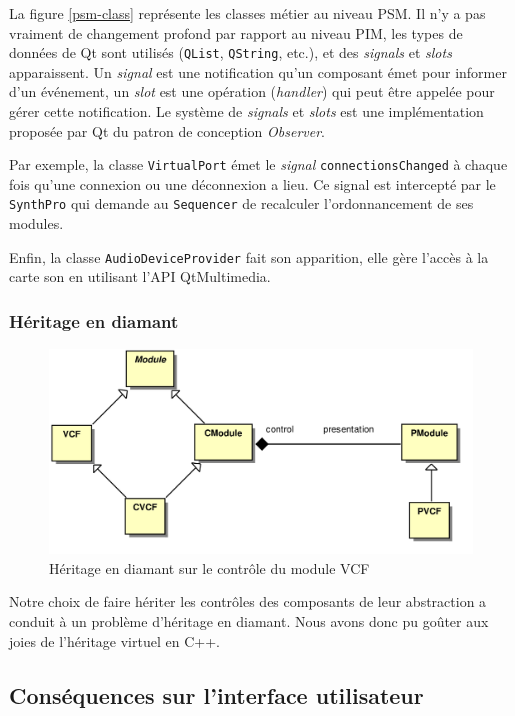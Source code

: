 La figure \ref{psm-class} représente les classes métier au niveau PSM. Il n'y a
pas vraiment de changement profond par rapport au niveau PIM, les
types de données de Qt sont utilisés (\verb!QList!, \verb!QString!,
etc.), et des \emph{signals} et \emph{slots} apparaissent. Un
\emph{signal} est une notification qu'un composant émet pour
informer d'un événement, un \emph{slot} est une opération
(\emph{handler}) qui peut être appelée pour gérer cette
notification. Le système de \emph{signals} et \emph{slots} est une
implémentation proposée par Qt du patron de conception
\emph{Observer}.

Par exemple, la classe \verb!VirtualPort! émet le \emph{signal}
\verb!connectionsChanged! à chaque fois qu'une connexion ou une
déconnexion a lieu. Ce signal est intercepté par le \verb!SynthPro!
qui demande au \verb!Sequencer! de recalculer l'ordonnancement de
ses modules.

Enfin, la classe \verb!AudioDeviceProvider! fait son apparition,
elle gère l'accès à la carte son en utilisant l'API QtMultimedia.

\subsubsection{Héritage en diamant}

\begin{figure}[htb]
\centering
\includegraphics[width=12cm]{../img/ps/pacmodule-psm.pdf}
\caption{Héritage en diamant sur le contrôle du module VCF}
\end{figure}

Notre choix de faire hériter les contrôles des composants de leur
abstraction a conduit à un problème d'héritage en diamant. Nous
avons donc pu goûter aux joies de l'héritage virtuel en C++.

\subsection{Conséquences sur l'interface utilisateur}

